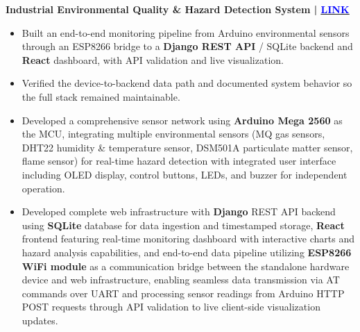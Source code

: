\noindent
{\noindent\fontsize{12pt}{15pt}\bfseries Industrial Environmental Quality \& Hazard Detection System | \href{https://github.com/humam-hossain/arduino-env-hazard.git}{\underline{\textcolor{blue}{LINK}}}}
\begin{itemize}
\ifsqa
    \item Built an end-to-end monitoring pipeline from Arduino environmental sensors through an ESP8266 bridge to a \textbf{Django REST API} / SQLite backend and \textbf{React} dashboard, with API validation and live visualization.
    \item Verified the device-to-backend data path and documented system behavior so the full stack remained maintainable.
\else
    \item Developed a comprehensive sensor network using \textbf{Arduino Mega 2560} as the MCU, integrating multiple environmental sensors (MQ gas sensors, DHT22 humidity \& temperature sensor, DSM501A particulate matter sensor, flame sensor) for real-time hazard detection with integrated user interface including OLED display, control buttons, LEDs, and buzzer for independent operation.
    \item Developed complete web infrastructure with \textbf{Django} REST API backend using \textbf{SQLite} database for data ingestion and timestamped storage, \textbf{React} frontend featuring real-time monitoring dashboard with interactive charts and hazard analysis capabilities, and end-to-end data pipeline utilizing \textbf{ESP8266 WiFi module} as a communication bridge between the standalone hardware device and web infrastructure, enabling seamless data transmission via AT commands over UART and processing sensor readings from Arduino HTTP POST requests through API validation to live client-side visualization updates.
\fi
\end{itemize}
